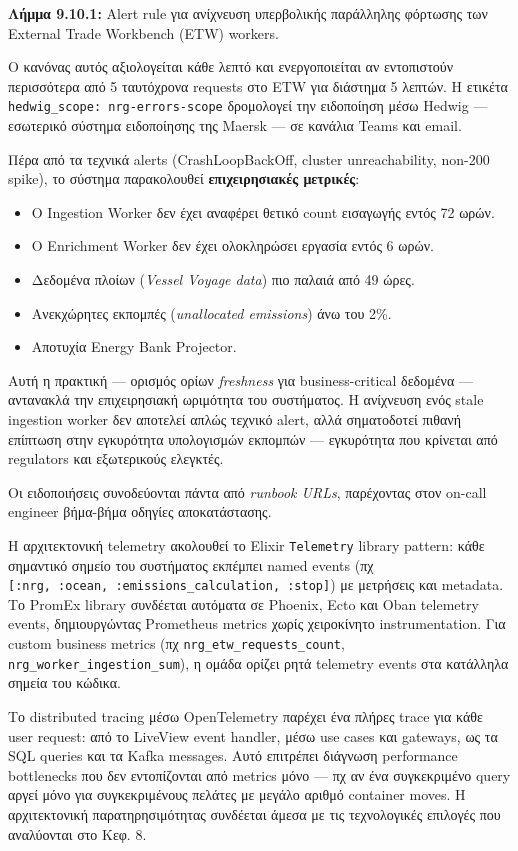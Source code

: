 \textbf{Λήμμα 9.10.1:} Alert rule για ανίχνευση υπερβολικής παράλληλης
φόρτωσης των External Trade Workbench (ETW) workers.

Ο κανόνας αυτός αξιολογείται κάθε λεπτό και ενεργοποιείται αν
εντοπιστούν περισσότερα από 5 ταυτόχρονα requests στο ETW για διάστημα 5
λεπτών. Η ετικέτα \texttt{hedwig\_scope:\ nrg-errors-scope} δρομολογεί
την ειδοποίηση μέσω Hedwig --- εσωτερικό σύστημα ειδοποίησης της Maersk
--- σε κανάλια Teams και email.

Πέρα από τα τεχνικά alerts (CrashLoopBackOff, cluster unreachability,
non-200 spike), το σύστημα παρακολουθεί \textbf{επιχειρησιακές
μετρικές}:

\begin{itemize}
\tightlist
\item
  Ο Ingestion Worker δεν έχει αναφέρει θετικό count εισαγωγής εντός 72
  ωρών.
\item
  Ο Enrichment Worker δεν έχει ολοκληρώσει εργασία εντός 6 ωρών.
\item
  Δεδομένα πλοίων (\emph{Vessel Voyage data}) πιο παλαιά από 49 ώρες.
\item
  Ανεκχώρητες εκπομπές (\emph{unallocated emissions}) άνω του 2\%.
\item
  Αποτυχία Energy Bank Projector.
\end{itemize}

Αυτή η πρακτική --- ορισμός ορίων \emph{freshness} για business-critical
δεδομένα --- αντανακλά την επιχειρησιακή ωριμότητα του συστήματος. Η
ανίχνευση ενός stale ingestion worker δεν αποτελεί απλώς τεχνικό alert,
αλλά σηματοδοτεί πιθανή επίπτωση στην εγκυρότητα υπολογισμών εκπομπών
--- εγκυρότητα που κρίνεται από regulators και εξωτερικούς ελεγκτές.

Οι ειδοποιήσεις συνοδεύονται πάντα από \emph{runbook URLs}, παρέχοντας
στον on-call engineer βήμα-βήμα οδηγίες αποκατάστασης.

Η αρχιτεκτονική telemetry ακολουθεί το Elixir \texttt{Telemetry} library
pattern: κάθε σημαντικό σημείο του συστήματος εκπέμπει named events (πχ
\texttt{{[}:nrg,\ :ocean,\ :emissions\_calculation,\ :stop{]}}) με
μετρήσεις και metadata. Το PromEx library συνδέεται αυτόματα σε Phoenix,
Ecto και Oban telemetry events, δημιουργώντας Prometheus metrics χωρίς
χειροκίνητο instrumentation. Για custom business metrics (πχ
\texttt{nrg\_etw\_requests\_count},
\texttt{nrg\_worker\_ingestion\_sum}), η ομάδα ορίζει ρητά telemetry
events στα κατάλληλα σημεία του κώδικα.

Το distributed tracing μέσω OpenTelemetry παρέχει ένα πλήρες trace για
κάθε user request: από το LiveView event handler, μέσω use cases και
gateways, ως τα SQL queries και τα Kafka messages. Αυτό επιτρέπει
διάγνωση performance bottlenecks που δεν εντοπίζονται από metrics μόνο
--- πχ αν ένα συγκεκριμένο query αργεί μόνο για συγκεκριμένους πελάτες
με μεγάλο αριθμό container moves. Η αρχιτεκτονική παρατηρησιμότητας
συνδέεται άμεσα με τις τεχνολογικές επιλογές που αναλύονται στο Κεφ. 8.

